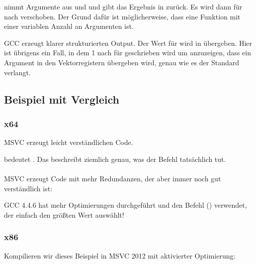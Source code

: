  nimmt Argumente aus  und  und gibt das Ergebnis in  zurück.
Es wird dann für \printf nach \RDX verschoben.
Der Grund dafür ist möglicherweise, dass \printf eine Funktion mit einer variablen Anzahl an Argumenten ist.


GCC erzeugt klarer strukturierten Output.
Der Wert für \printf wird in  übergeben.
Hier ist übrigens ein Fall, in dem 1 nach \EAX für \printf geschrieben wird um anzuzeigen, dass ein Argument in den
Vektorregistern übergeben wird, genau wie es der Standard \SysVABI verlangt.

\subsection{Beispiel mit Vergleich}



\subsubsection{x64}



\Optimizing MSVC erzeugt leicht verständlichen Code.

 bedeutet . Das beschreibt ziemlich genau, was der Befehl tatsächlich tut.\\
\\
\NonOptimizing MSVC erzeugt Code mit mehr Redundanzen, der aber immer noch gut verständlich ist:



GCC 4.4.6 hat mehr Optimierungen durchgeführt und den Befehl  () verwendet, der einfach den größten Wert auswählt!



\clearpage
\subsubsection{x86}
Kompilieren wir dieses Beispiel in MSVC 2012 mit aktivierter Optimierung:

